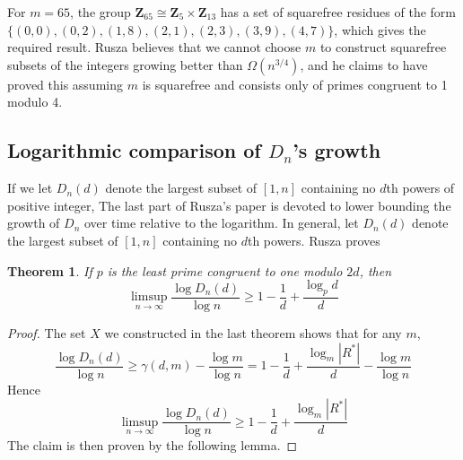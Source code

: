 \documentclass{article}
\theoremstyle{plain}
\theoremstyle{plain}
\newtheorem{theorem}{Theorem}
\begin{document}
For $m = 65$, the group $\mathbf{Z}_{65} \cong \mathbf{Z}_{5} \times \mathbf{Z}_{13}$ has a set of squarefree residues of the form $\{ (0,0), (0,2), (1,8), (2,1), (2,3), (3,9), (4,7) \}$, which gives the required result. Rusza believes that we cannot choose $m$ to construct squarefree subsets of the integers growing better than $\Omega(n^{3/4})$, and he claims to have proved this assuming $m$ is squarefree and consists only of primes congruent to 1 modulo 4.

\subsection{Logarithmic comparison of $D_n$'s growth}

If we let $D_n(d)$ denote the largest subset of $[1,n]$ containing no $d$th powers of positive integer,
The last part of Rusza's paper is devoted to lower bounding the growth of $D_n$ over time relative to the logarithm. In general, let $D_n(d)$ denote the largest subset of $[1,n]$ containing no $d$th powers. Rusza proves

\begin{theorem}
    If $p$ is the least prime congruent to one modulo $2d$, then
    \[ \limsup_{n \to \infty} \frac{\log D_n(d)}{\log n} \geq 1 - \frac{1}{d} + \frac{\log_p d}{d} \]
\end{theorem}
\begin{proof}
    The set $X$ we constructed in the last theorem shows that for any $m$,
    \[ \frac{\log D_n(d)}{\log n} \geq \gamma(d,m) - \frac{\log m}{\log n} = 1 - \frac{1}{d} + \frac{\log_m |R^*|}{d} - \frac{\log m}{\log n} \]
    Hence
    \[ \limsup_{n \to \infty} \frac{\log D_n(d)}{\log n} \geq 1 - \frac{1}{d} + \frac{\log_m |R^*|}{d} \]
    The claim is then proven by the following lemma.
\end{proof}
\end{document}
